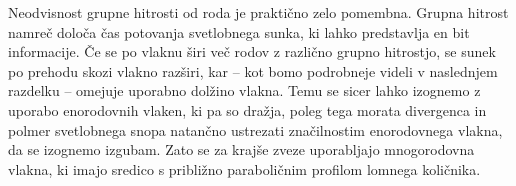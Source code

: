Neodvisnost grupne hitrosti od roda je praktično zelo pomembna. 
Grupna hitrost namreč določa čas potovanja svetlobnega sunka, ki
lahko predstavlja en bit informacije. Če se po vlaknu širi več
rodov z različno grupno hitrostjo, se sunek po prehodu skozi
vlakno razširi, kar -- kot bomo podrobneje videli v naslednjem razdelku -- omejuje 
uporabno dolžino vlakna. Temu se sicer lahko izognemo z uporabo enorodovnih vlaken,
ki pa so dražja, poleg tega morata divergenca in polmer svetlobnega snopa 
natančno ustrezati značilnostim enorodovnega vlakna, da se izognemo izgubam. 
Zato se za krajše zveze uporabljajo mnogorodovna vlakna, ki imajo sredico s 
približno paraboličnim profilom lomnega količnika.

% 
% 
